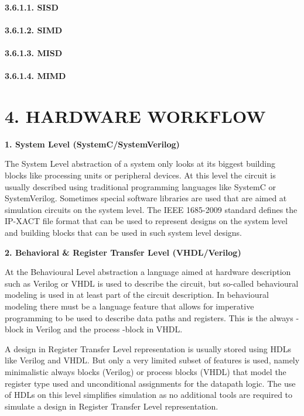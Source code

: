 \documentclass[
]{article}
\begin{document}
\hypertarget{sisd}{%
\paragraph{3.6.1.1. SISD}\label{sisd}}

\hypertarget{simd}{%
\paragraph{3.6.1.2. SIMD}\label{simd}}

\hypertarget{misd}{%
\paragraph{3.6.1.3. MISD}\label{misd}}

\hypertarget{mimd}{%
\paragraph{3.6.1.4. MIMD}\label{mimd}}

\hypertarget{hardware-workflow}{%
\section{4. HARDWARE WORKFLOW}\label{hardware-workflow}}

\textbf{1. System Level (SystemC/SystemVerilog)}

The System Level abstraction of a system only looks at its biggest
building blocks like processing units or peripheral devices. At this
level the circuit is usually described using traditional programming
languages like SystemC or SystemVerilog. Sometimes special software
libraries are used that are aimed at simulation circuits on the system
level. The IEEE 1685-2009 standard defines the IP-XACT file format that
can be used to represent designs on the system level and building blocks
that can be used in such system level designs.

\textbf{2. Behavioral \& Register Transfer Level (VHDL/Verilog)}

At the Behavioural Level abstraction a language aimed at hardware
description such as Verilog or VHDL is used to describe the circuit, but
so-called behavioural modeling is used in at least part of the circuit
description. In behavioural modeling there must be a language feature
that allows for imperative programming to be used to describe data paths
and registers. This is the always -block in Verilog and the process
-block in VHDL.

A design in Register Transfer Level representation is usually stored
using HDLs like Verilog and VHDL. But only a very limited subset of
features is used, namely minimalistic always blocks (Verilog) or process
blocks (VHDL) that model the register type used and unconditional
assignments for the datapath logic. The use of HDLs on this level
simplifies simulation as no additional tools are required to simulate a
design in Register Transfer Level representation.
\end{document}
